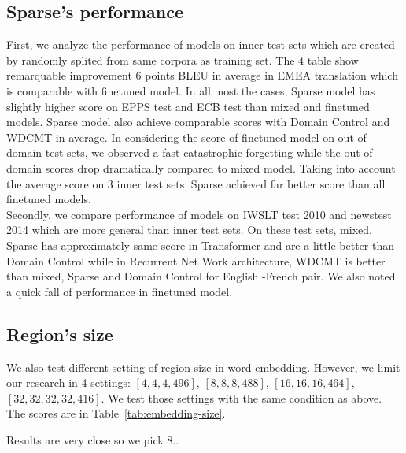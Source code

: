 \documentclass[11pt,a4paper]{article}
\newcommand{\fyTodo}[1]{\Todo[FY:]{\textcolor{orange}{#1}}}
\begin{document}
\subsection{Sparse's performance}
First, we analyze the performance of models on inner test sets which are created by randomly splited from same corpora as training set. The 4 table show remarquable improvement 6 points BLEU in average in EMEA translation which is comparable with finetuned model. In all most the cases, Sparse model has slightly higher score on EPPS test and ECB test than mixed and finetuned models. Sparse model also achieve comparable scores with Domain Control and WDCMT in average. In considering the score of finetuned model on out-of-domain test sets, we observed a fast catastrophic forgetting while the out-of-domain scores drop dramatically compared to mixed model. Taking into account the average score on 3 inner test sets, Sparse achieved far better score than all finetuned models. \\
Secondly, we compare performance of models on IWSLT test 2010 and newstest 2014 which are more general than inner test sets. On these test sets, mixed, Sparse has approximately same score in Transformer and are a little better than Domain Control while in Recurrent Net Work architecture, WDCMT is better than mixed, Sparse and Domain Control for English -French pair. We also noted a quick fall of performance in finetuned model.

\subsection{Region's size \label{secc:region_size}}

We also test different setting of region size in word embedding. However, we limit our research in 4 settings: $[4,4,4,496]$, $[8,8,8,488]$, $[16,16,16,464]$, $[32,32,32,32,416]$. We test those settings with the same condition as above. The scores are in Table~\ref{tab:embedding-size}.\fyTodo{Comment, homegenize captions.}

Results are very close so we pick 8.\fyTodo{Experiment with 64}. 
\end{document}
